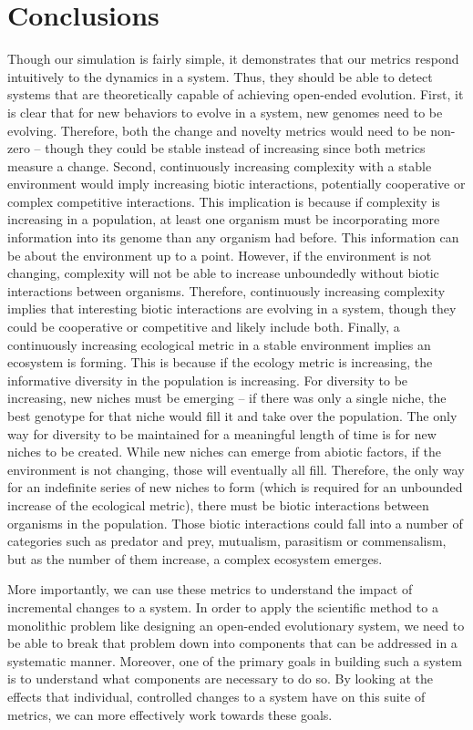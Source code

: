 \documentclass[letterpaper]{article}
\begin{document}
\section{Conclusions}
Though our simulation is fairly simple, it demonstrates that our metrics respond intuitively to the dynamics in a system. Thus, they should be able to detect systems that are theoretically capable of achieving open-ended evolution. First, it is clear that for new behaviors to evolve in a system, new genomes need to be evolving. Therefore, both the change and novelty metrics would need to be non-zero -- though they could be stable instead of increasing since both metrics measure a change. 
Second, continuously increasing complexity with a stable environment would imply increasing biotic interactions, potentially cooperative or complex competitive interactions. This implication is because if complexity is increasing in a population, at least one organism must be incorporating more information into its genome than any organism had before. This information can be about the environment up to a point. However, if the environment is not changing, complexity will not be able to increase unboundedly without biotic interactions between organisms. Therefore, continuously increasing complexity implies that interesting biotic interactions are evolving in a system, though they could be cooperative or competitive and likely include both.
Finally, a continuously increasing ecological metric in a stable environment implies an ecosystem is forming. This is because if the ecology metric is increasing, the informative diversity in the population is increasing. For diversity to be increasing, new niches must be emerging -- if there was only a single niche, the best genotype for that niche would fill it and take over the population. The only way for diversity to be maintained for a meaningful length of time is for new niches to be created. While new niches can emerge from abiotic factors, if the environment is not changing, those will eventually all fill. Therefore, the only way for an indefinite series of new niches to form (which is required for an unbounded increase of the ecological metric), there must be biotic interactions between organisms in the population. Those biotic interactions could fall into a number of categories such as predator and prey, mutualism, parasitism or commensalism, but as the number of them increase, a complex ecosystem emerges.

 More importantly, we can use these metrics to understand the impact of incremental changes to a system. In order to apply the scientific method to a monolithic problem like designing an open-ended evolutionary system, we need to be able to break that problem down into components that can be addressed in a systematic manner. Moreover, one of the primary goals in building such a system is to understand what components are necessary to do so. By looking at the effects that individual, controlled changes to a system have on this suite of metrics, we can more effectively work towards these goals.
\end{document}
